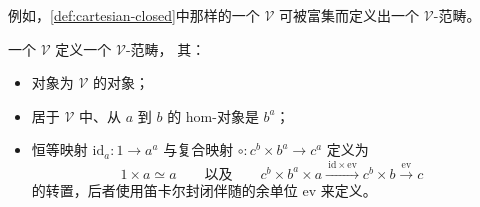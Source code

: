 例如，\cref{def:cartesian-closed}中那样的一个\trCartesianClosed{}\trCategory{}
$\mathcal{V}$ 可被富集而定义出一个 $\mathcal{V}$-范畴。

\begin{lemma}\label{lem:cartesian-closed-v-category}
一个\trCartesianClosed{}\trCategory{} $\mathcal{V}$ 定义一个 $\mathcal{V}$-范畴，
其：
\begin{itemize}
\item 对象为 $\mathcal{V}$ 的对象；
\item 居于 $\mathcal{V}$ 中、从 $a$ 到 $b$ 的 hom-对象是\trInternalHom{}
  $b^{a}$；
\item 恒等映射 $\mathrm{id}_{a}\colon 1\to a^{a}$ 与复合映射
  $\circ\colon c^{b}\times b^{a}\to c^{a}$ 定义为
  \[ 1\times a\simeq a \qquad\text{以及}\qquad
     c^{b}\times b^{a}\times a
     \xrightarrow{\ \mathrm{id}\times\mathrm{ev}\ }c^{b}\times b
     \xrightarrow{\ \mathrm{ev}\ }c \]
  的转置，后者使用笛卡尔封闭伴随的余单位 $\mathrm{ev}$ 来定义。
\end{itemize}
\end{lemma}

